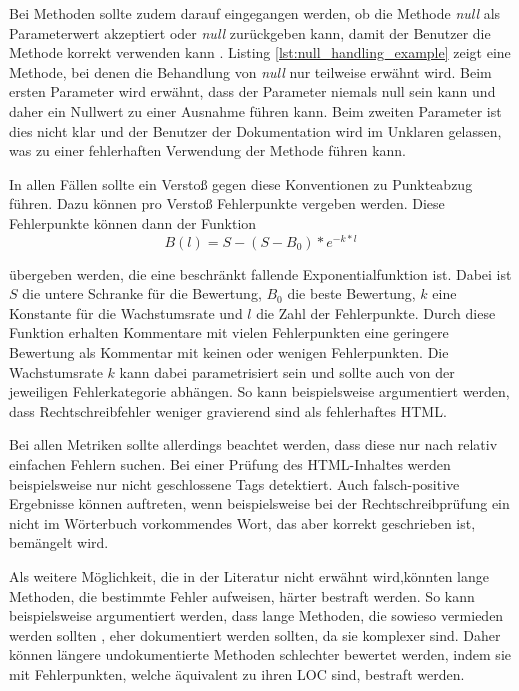 Bei Methoden sollte zudem darauf eingegangen werden, ob die Methode \textit{null} als Parameterwert akzeptiert oder \textit{null} zurückgeben kann, damit der Benutzer die Methode korrekt verwenden kann \cite{javadoc_coding_standards}. Listing \ref{lst:null_handling_example} zeigt eine Methode, bei denen die Behandlung von \textit{null} nur teilweise erwähnt wird. Beim ersten Parameter wird erwähnt, dass der Parameter niemals null sein kann und daher ein Nullwert zu einer Ausnahme führen kann.  Beim zweiten Parameter ist dies nicht klar und der Benutzer der Dokumentation wird im Unklaren gelassen, was zu einer fehlerhaften Verwendung der Methode führen kann.

In allen Fällen sollte ein Verstoß gegen diese Konventionen zu Punkteabzug führen.
Dazu können pro Verstoß Fehlerpunkte vergeben werden. Diese Fehlerpunkte können dann der Funktion 
\begin{equation}
     B(l)=S-(S-B_0)*e^{-k*l}
 \end{equation} 
 
 übergeben werden, die eine beschränkt fallende Exponentialfunktion ist. Dabei ist $S$ die untere Schranke für die Bewertung, $B_0$ die beste Bewertung,  $k$ eine Konstante für die Wachstumsrate und $l$ die Zahl der Fehlerpunkte. Durch diese Funktion erhalten Kommentare mit vielen Fehlerpunkten eine geringere Bewertung als Kommentar mit keinen oder wenigen Fehlerpunkten. Die Wachstumsrate $k$ kann dabei parametrisiert sein und sollte auch von der jeweiligen Fehlerkategorie abhängen. So kann beispielsweise argumentiert werden, dass Rechtschreibfehler weniger gravierend sind als fehlerhaftes HTML. 
 
 Bei allen Metriken sollte allerdings beachtet werden, dass diese nur nach relativ einfachen Fehlern suchen. Bei einer Prüfung des \ac{HTML}-Inhaltes werden beispielsweise nur nicht geschlossene Tags detektiert. Auch falsch-positive Ergebnisse können auftreten, wenn beispielsweise bei der Rechtschreibprüfung ein nicht im Wörterbuch vorkommendes Wort, das aber korrekt geschrieben ist, bemängelt wird.   
 
 Als weitere Möglichkeit, die in der Literatur nicht erwähnt wird,könnten lange Methoden, die bestimmte Fehler aufweisen, härter bestraft werden. So kann beispielsweise argumentiert werden, dass lange Methoden, die sowieso vermieden werden sollten \cite[S. 34]{martin2009clean}, eher dokumentiert werden sollten, da sie komplexer sind. Daher können längere undokumentierte Methoden schlechter bewertet werden, indem sie mit Fehlerpunkten, welche äquivalent zu ihren \ac{LOC} sind, bestraft werden. 

